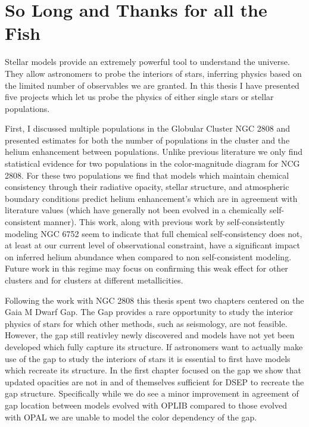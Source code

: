 \chapter{So Long and Thanks for all the Fish}
Stellar models provide an extremely powerful tool to understand the universe.
They allow astronomers to probe the interiors of stars, inferring physics based
on the limited number of observables we are granted. In this thesis I have
presented five projects which let us probe the physics of either single stars
or stellar populations.

First, I discussed multiple populations in the Globular Cluster NGC 2808 and
presented estimates for both the number of populations in the cluster and the
helium enhancement between populations. Unlike previous literature we only find
statistical evidence for two populations in the color-magnitude diagram for NCG
2808. For these two populations we find that models which maintain chemical
consistency through their radiative opacity, stellar structure, and atmospheric
boundary conditions predict helium enhancement's which are in agreement with
literature values (which have generally not been evolved in a chemically
self-consistent manner). This work, along with previous work by
\citet{Dotter2016} self-consistently modeling NGC 6752 seem to indicate that
full chemical self-consistency does not, at least at our current level of
observational constraint, have a significant impact on inferred helium abundance
when compared to non self-consistent modeling. Future work in this regime may
focus on confirming this weak effect for other clusters and for clusters at
different metallicities.

Following the work with NGC 2808 this thesis spent two chapters centered on the
Gaia M Dwarf Gap. The Gap provides a rare opportunity to study the interior
physics of stars for which other methods, such as seismology, are not feasible.
However, the gap still reativley newly discovered and models have not yet been
developed which fully capture its structure. If astronomers want to actually
make use of the gap to study the interiors of stars it is essential to first
have models which recreate its structure. In the first chapter focused on the
gap we show that updated opacities are not in and of themselves sufficient for
DSEP to recreate the gap structure. Specifically while we do see a minor
improvement in agreement of gap location between models evolved with OPLIB
compared to those evolved with OPAL we are unable to model the color dependency
of the gap. 

